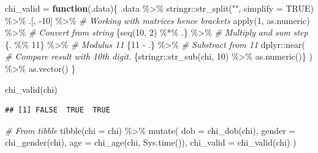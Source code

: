 \documentclass[
]{book}
\newenvironment{Shaded}{\begin{snugshade}}{\end{snugshade}}
\newcommand{\AttributeTok}[1]{\textcolor[rgb]{0.77,0.63,0.00}{#1}}
\newcommand{\CommentTok}[1]{\textcolor[rgb]{0.56,0.35,0.01}{\textit{#1}}}
\newcommand{\ConstantTok}[1]{\textcolor[rgb]{0.00,0.00,0.00}{#1}}
\newcommand{\ControlFlowTok}[1]{\textcolor[rgb]{0.13,0.29,0.53}{\textbf{#1}}}
\newcommand{\DecValTok}[1]{\textcolor[rgb]{0.00,0.00,0.81}{#1}}
\newcommand{\FunctionTok}[1]{\textcolor[rgb]{0.00,0.00,0.00}{#1}}
\newcommand{\NormalTok}[1]{#1}
\newcommand{\OtherTok}[1]{\textcolor[rgb]{0.56,0.35,0.01}{#1}}
\newcommand{\SpecialCharTok}[1]{\textcolor[rgb]{0.00,0.00,0.00}{#1}}
\newcommand{\StringTok}[1]{\textcolor[rgb]{0.31,0.60,0.02}{#1}}
\begin{document}
\begin{Shaded}
\begin{Highlighting}[]
\NormalTok{chi\_valid }\OtherTok{=} \ControlFlowTok{function}\NormalTok{(.data)\{}
\NormalTok{  .data }\SpecialCharTok{\%\textgreater{}\%} 
\NormalTok{    stringr}\SpecialCharTok{::}\FunctionTok{str\_split}\NormalTok{(}\StringTok{""}\NormalTok{, }\AttributeTok{simplify =} \ConstantTok{TRUE}\NormalTok{) }\SpecialCharTok{\%\textgreater{}\%} 
\NormalTok{    .[, }\SpecialCharTok{{-}}\DecValTok{10}\NormalTok{] }\SpecialCharTok{\%\textgreater{}\%}              \CommentTok{\# Working with matrices hence brackets}
    \FunctionTok{apply}\NormalTok{(}\DecValTok{1}\NormalTok{, as.numeric) }\SpecialCharTok{\%\textgreater{}\%}  \CommentTok{\# Convert from string}
\NormalTok{    \{}\FunctionTok{seq}\NormalTok{(}\DecValTok{10}\NormalTok{, }\DecValTok{2}\NormalTok{) }\SpecialCharTok{\%*\%}\NormalTok{ .\} }\SpecialCharTok{\%\textgreater{}\%}    \CommentTok{\# Multiply and sum step}
\NormalTok{    \{. }\SpecialCharTok{\%\%} \DecValTok{11}\NormalTok{\} }\SpecialCharTok{\%\textgreater{}\%}             \CommentTok{\# Modulus 11}
\NormalTok{    \{}\DecValTok{11} \SpecialCharTok{{-}}\NormalTok{ .\} }\SpecialCharTok{\%\textgreater{}\%}              \CommentTok{\# Substract from 11}
\NormalTok{    dplyr}\SpecialCharTok{::}\FunctionTok{near}\NormalTok{(              }\CommentTok{\# Compare result with 10th digit. }
\NormalTok{      \{stringr}\SpecialCharTok{::}\FunctionTok{str\_sub}\NormalTok{(chi, }\DecValTok{10}\NormalTok{) }\SpecialCharTok{\%\textgreater{}\%} \FunctionTok{as.numeric}\NormalTok{()\}}
\NormalTok{    ) }\SpecialCharTok{\%\textgreater{}\%} 
    \FunctionTok{as.vector}\NormalTok{()}
\NormalTok{\}}

\FunctionTok{chi\_valid}\NormalTok{(chi)}
\end{Highlighting}
\end{Shaded}

\begin{verbatim}
## [1] FALSE  TRUE  TRUE
\end{verbatim}

\begin{Shaded}
\begin{Highlighting}[]
\CommentTok{\# From tibble}
\FunctionTok{tibble}\NormalTok{(}\AttributeTok{chi =}\NormalTok{ chi) }\SpecialCharTok{\%\textgreater{}\%} 
  \FunctionTok{mutate}\NormalTok{(}
    \AttributeTok{dob =} \FunctionTok{chi\_dob}\NormalTok{(chi),}
    \AttributeTok{gender =} \FunctionTok{chi\_gender}\NormalTok{(chi),}
    \AttributeTok{age =} \FunctionTok{chi\_age}\NormalTok{(chi, }\FunctionTok{Sys.time}\NormalTok{()),}
    \AttributeTok{chi\_valid =} \FunctionTok{chi\_valid}\NormalTok{(chi)}
\NormalTok{  )}
\end{Highlighting}
\end{Shaded}
\end{document}
